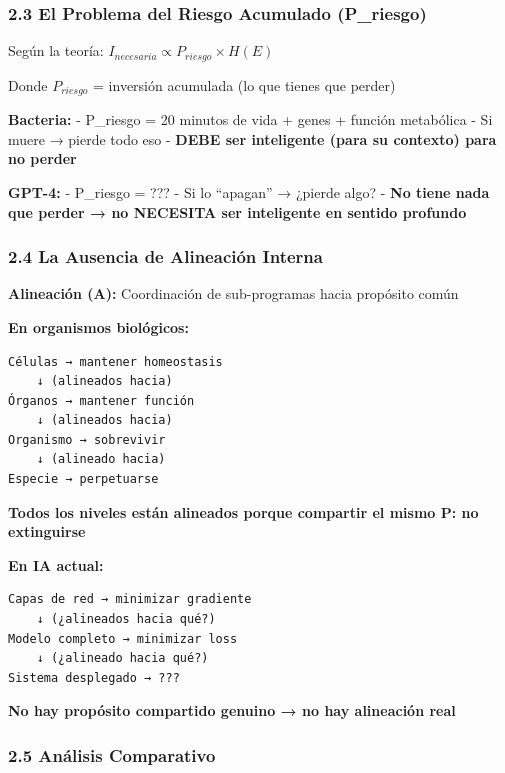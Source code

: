 \subsubsection{2.3 El Problema del Riesgo Acumulado
(P\_riesgo)}\label{el-problema-del-riesgo-acumulado-p_riesgo}

Según la teoría:
\textbf{\(I_{necesaria} \propto P_{riesgo} \times H(E)\)}

Donde \(P_{riesgo}\) = inversión acumulada (lo que tienes que perder)

\textbf{Bacteria:} - P\_riesgo = 20 minutos de vida + genes + función
metabólica - Si muere → pierde todo eso - \textbf{DEBE ser inteligente
(para su contexto) para no perder}

\textbf{GPT-4:} - P\_riesgo = ??? - Si lo ``apagan'' → ¿pierde algo? -
\textbf{No tiene nada que perder → no NECESITA ser inteligente en
sentido profundo}

\subsubsection{2.4 La Ausencia de Alineación
Interna}\label{la-ausencia-de-alineaciuxf3n-interna}

\textbf{Alineación (A):} Coordinación de sub-programas hacia propósito
común

\textbf{En organismos biológicos:}

\begin{verbatim}
Células → mantener homeostasis
    ↓ (alineados hacia)
Órganos → mantener función
    ↓ (alineados hacia)
Organismo → sobrevivir
    ↓ (alineado hacia)
Especie → perpetuarse
\end{verbatim}

\textbf{Todos los niveles están alineados porque compartir el mismo P:
no extinguirse}

\textbf{En IA actual:}

\begin{verbatim}
Capas de red → minimizar gradiente
    ↓ (¿alineados hacia qué?)
Modelo completo → minimizar loss
    ↓ (¿alineado hacia qué?)
Sistema desplegado → ???
\end{verbatim}

\textbf{No hay propósito compartido genuino → no hay alineación real}

\subsubsection{2.5 Análisis Comparativo}\label{anuxe1lisis-comparativo}

